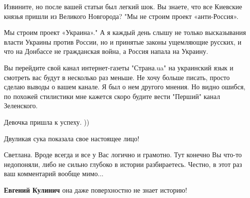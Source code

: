 \begin{itemize}
Извините, но после вашей статьи был легкий шок. Вы знаете, что все Киевские
князья пришли из Великого Новгорода? "Мы не строим проект «анти-Россия». 

Мы строим проект «Украина»." А я каждый день слышу не только высказывания
власти Украины против России, но и принятые законы ущемляющие русских, и что на
Донбассе не гражданская война, а Россия напала на Украину. 

Вы перейдите свой канал интернет-газеты "Страна.ua" на украинский язык и
смотреть вас будут в несколько раз меньше. Не хочу больше писать, просто сделаю
выводы о вашем канале. Я был о нем другого мнения. Но видно ошибся, по похожей
стилистики мне кажется скоро будите вести "Перший" канал Зеленского.

 
Девочка пришла к успеху. ))

 
Двуликая сука показала свое настоящее лицо!

 

Светлана. Вроде всегда и все у Вас логично и грамотно. Тут конечно Вы что-то
недопоняли, либо не сильно глубоко в истории разбираетесь. Честно, в этот раз
ваш комментарий вообще мимо...

\begin{itemize}
 
\textbf{Евгений Кулинич} она даже поверхностно не знает историю!
\end{itemize}

 


\end{itemize}
